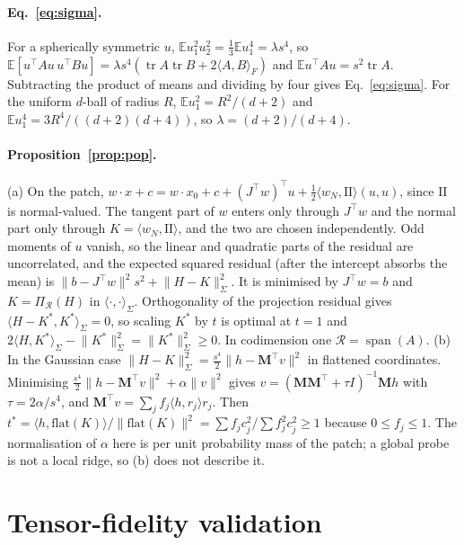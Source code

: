 \documentclass[10pt]{article}
\newcommand{\norm}[1]{\lVert #1 \rVert}
\newcommand{\II}{\mathrm{II}}
\begin{document}
\paragraph{Eq.~\eqref{eq:sigma}.} For a spherically symmetric $u$, $\mathbb{E}u_1^2u_2^2=\tfrac13\mathbb{E}u_1^4=\lambda s^4$, so $\mathbb{E}[u^\top Au\,u^\top Bu]=\lambda s^4(\operatorname{tr}A\operatorname{tr}B+2\langle A,B\rangle_F)$ and $\mathbb{E}u^\top Au=s^2\operatorname{tr}A$. Subtracting the product of means and dividing by four gives Eq.~\eqref{eq:sigma}. For the uniform $d$-ball of radius $R$, $\mathbb{E}u_1^2=R^2/(d+2)$ and $\mathbb{E}u_1^4=3R^4/((d+2)(d+4))$, so $\lambda=(d+2)/(d+4)$.

\paragraph{Proposition~\ref{prop:pop}.} (a) On the patch, $w\cdot x+c=w\cdot x_0+c+(J^\top w)^\top u+\tfrac12\langle w_N,\II\rangle(u,u)$, since $\II$ is normal-valued. The tangent part of $w$ enters only through $J^\top w$ and the normal part only through $K=\langle w_N,\II\rangle$, and the two are chosen independently. Odd moments of $u$ vanish, so the linear and quadratic parts of the residual are uncorrelated, and the expected squared residual (after the intercept absorbs the mean) is $\norm{b-J^\top w}^2s^2+\norm{H-K}^2_\Sigma$. It is minimised by $J^\top w=b$ and $K=\Pi_{\mathcal R}(H)$ in $\langle\cdot,\cdot\rangle_\Sigma$. Orthogonality of the projection residual gives $\langle H-K^*,K^*\rangle_\Sigma=0$, so scaling $K^*$ by $t$ is optimal at $t=1$ and $2\langle H,K^*\rangle_\Sigma-\norm{K^*}^2_\Sigma=\norm{K^*}^2_\Sigma\ge0$. In codimension one $\mathcal R=\operatorname{span}(A)$. (b) In the Gaussian case $\norm{H-K}_\Sigma^2=\tfrac{s^4}{2}\norm{h-\mathbf{M}^\top v}^2$ in flattened coordinates. Minimising $\tfrac{s^4}{2}\norm{h-\mathbf M^\top v}^2+\alpha\norm{v}^2$ gives $v=(\mathbf M\mathbf M^\top+\tau I)^{-1}\mathbf Mh$ with $\tau=2\alpha/s^4$, and $\mathbf M^\top v=\sum_jf_j\langle h,r_j\rangle r_j$. Then $t^*=\langle h,\mathrm{flat}(K)\rangle/\norm{\mathrm{flat}(K)}^2=\sum f_jc_j^2/\sum f_j^2c_j^2\ge1$ because $0\le f_j\le1$. The normalisation of $\alpha$ here is per unit probability mass of the patch; a global probe is not a local ridge, so (b) does not describe it.

\clearpage
\section{Tensor-fidelity validation}
\label{app:tf}
\end{document}
